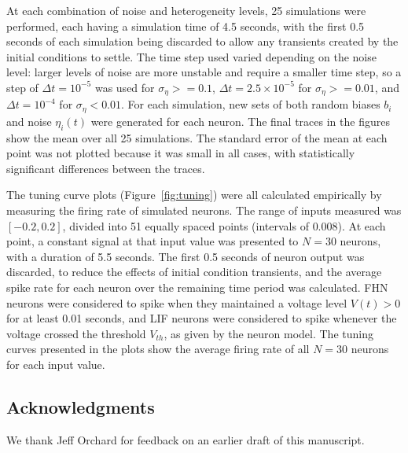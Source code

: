 \documentclass[12pt]{article}
\begin{document}
At each combination of noise and heterogeneity levels, 25 simulations were performed, each having a simulation time of 4.5 seconds, with the first 0.5 seconds of each simulation being discarded to allow any transients created by the initial conditions to settle. The time step used varied depending on the noise level: larger levels of noise are more unstable and require a smaller time step, so a step of $\Delta t = 10^{-5}$ was used for $\sigma_\eta >= 0.1$, $\Delta t = 2.5 \times 10^{-5}$ for $\sigma_\eta >= 0.01$, and $\Delta t = 10^{-4}$ for $\sigma_\eta < 0.01$. For each simulation, new sets of both random biases $b_i$ and noise $\eta_i(t)$ were generated for each neuron. The final traces in the figures show the mean over all 25 simulations. The standard error of the mean at each point was not plotted because it was small in all cases, with statistically significant differences between the traces.

The tuning curve plots (Figure~\ref{fig:tuning}) were all calculated empirically by measuring the firing rate of simulated neurons. The range of inputs measured was $[-0.2, 0.2]$, divided into 51 equally spaced points (intervals of $0.008$). At each point, a constant signal at that input value was presented to $N = 30$ neurons, with a duration of 5.5 seconds. The first 0.5 seconds of neuron output was discarded, to reduce the effects of initial condition transients, and the average spike rate for each neuron over the remaining time period was calculated. FHN neurons were considered to spike when they maintained a voltage level $V(t) > 0$ for at least 0.01 seconds, and LIF neurons were considered to spike whenever the voltage crossed the threshold $V_{th}$, as given by the neuron model. The tuning curves presented in the plots show the average firing rate of all $N = 30$ neurons for each input value.

\subsection*{Acknowledgments}

We thank Jeff Orchard for feedback on an earlier draft of this manuscript.
\end{document}
